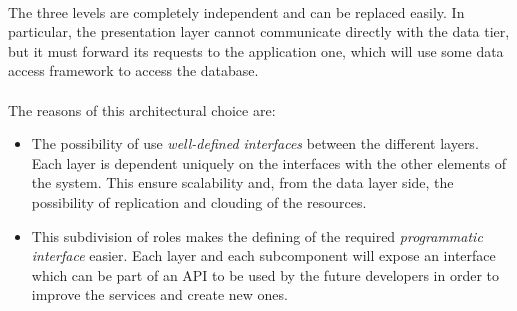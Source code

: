 \paragraph{}The three levels are completely independent and can be replaced easily. In particular, the presentation layer cannot communicate directly with the data tier, but it must forward its requests to the application one, which will use some data access framework to access the database.
\paragraph{} The reasons of this architectural choice are:
\begin{itemize}
	\item The possibility of use \textit{well-defined interfaces} between the different layers. Each layer is dependent uniquely on the interfaces with the other elements of the system. This ensure scalability and, from the data layer side, the possibility of replication and clouding of the resources.
	\item This subdivision of roles makes the defining of the required \textit{programmatic interface} easier. Each layer and each subcomponent will expose an interface which can be part of an API to be used by the future developers in order to improve the services and create new ones.
\end{itemize}


